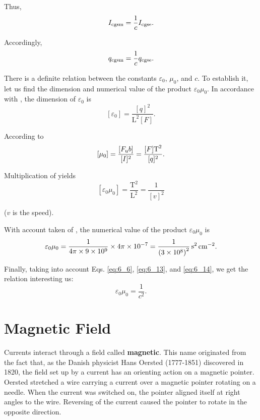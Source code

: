 \noindent
Thus,
\begin{equation}\label{eq:6_9}
    I_{\text{cgsm}} = \frac{1}{c} I_{\text{cgse}}.
\end{equation}

\noindent
Accordingly,
\begin{equation}\label{eq:6_10}
    q_{\text{cgsm}} = \frac{1}{c} q_{\text{cgse}}.
\end{equation}

There is a definite relation between the constants $\varepsilon_0$, $\mu_0$, and $c$. To establish it, let us find the dimension and numerical value of the product $\varepsilon_0\mu_0$. In accordance with , the dimension of $\varepsilon_0$ is
\begin{equation}\label{eq:6_11}
    [\varepsilon_0] = \frac{[q]^2}{\text{L}^2 [F]}.
\end{equation}

\noindent
According to 
\begin{equation}\label{eq:6_12}
    [\mu_0] = \frac{[F_{\text{u}} b]}{[I]^2} = \frac{[F] \text{T}^2}{[q]^2}.
\end{equation}

\noindent
Multiplication of  yields
\begin{equation}\label{eq:6_13}
    [\varepsilon_0\mu_0] = \frac{\text{T}^2}{\text{L}^2} = \frac{1}{[v]^2}
\end{equation}

\noindent
($v$ is the speed).

With account taken of , the numerical value of the product $\varepsilon_0\mu_0$ is
\begin{equation}\label{eq:6_14}
    \varepsilon_0\mu_0 = \frac{1}{4 \pi \times \num{9e9}} \times 4\pi \times \num{e-7} = \frac{1}{\left(\num{3e8}\right)^2}\, \si{\second\squared\per\centi\metre\squared}.
\end{equation}

Finally, taking into account Eqs. \eqref{eq:6_6}, \eqref{eq:6_13}, and \eqref{eq:6_14}, we get the relation interesting us:
\begin{equation}\label{eq:6_15}
    \varepsilon_0\mu_0 = \frac{1}{c^2}.
\end{equation}

\section{Magnetic Field}\label{sec:6_2}

Currents interact through a field called \textbf{magnetic}. This name originated from the fact that, as the Danish physicist Hans Oersted
(1777-1851) discovered in 1820, the field set up by a current has an orienting action on a magnetic pointer. Oersted stretched a wire carrying a current over a magnetic pointer rotating on a needle. When the current was switched on, the pointer aligned itself at right angles to the wire. Reversing of the current caused the pointer to rotate in the opposite direction.

